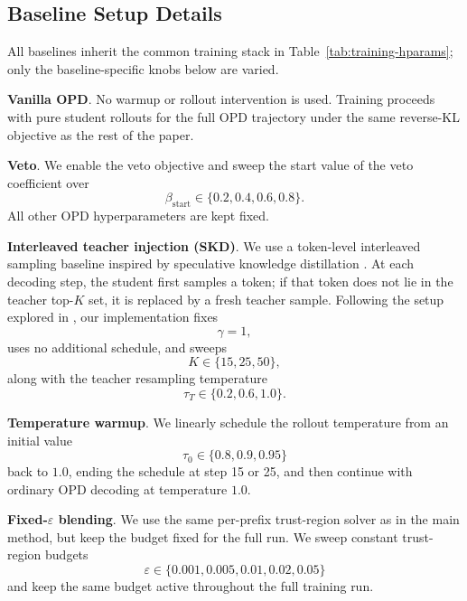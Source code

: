 \documentclass[11pt]{article}
\renewcommand{\paragraph}[1]{\vspace{1mm}\noindent\textbf{#1}.}
\begin{document}
\subsection{Baseline Setup Details}
\label{app:baseline_setups}

All baselines inherit the common training stack in Table~\ref{tab:training-hparams}; only the baseline-specific knobs below are varied.

\paragraph{Vanilla OPD}
No warmup or rollout intervention is used.
Training proceeds with pure student rollouts for the full OPD trajectory under the same reverse-KL objective as the rest of the paper.

\paragraph{Veto}
We enable the veto objective \citep{veto} and sweep the start value of the veto coefficient over
\[
\beta_{\mathrm{start}} \in \{0.2, 0.4, 0.6, 0.8\}.
\]
All other OPD hyperparameters are kept fixed.

\paragraph{Interleaved teacher injection (SKD)}
We use a token-level interleaved sampling baseline inspired by speculative knowledge distillation \citep{skd}.
At each decoding step, the student first samples a token; if that token does not lie in the teacher top-$K$ set, it is replaced by a fresh teacher sample.
Following the setup explored in \citet{skd}, our implementation fixes
\[
 \gamma = 1,
\]
uses no additional schedule, and sweeps
\[
K \in \{15,25,50\},
\]
along with the teacher resampling temperature
\[
\tau_T \in \{0.2, 0.6, 1.0\}.
\]

\paragraph{Temperature warmup}
We linearly schedule the rollout temperature from an initial value
\[
\tau_0 \in \{0.8, 0.9, 0.95\}
\]
back to $1.0$, ending the schedule at step 15 or 25, and then continue with ordinary OPD decoding at temperature $1.0$.

\paragraph{Fixed-$\varepsilon$ blending}
We use the same per-prefix trust-region solver as in the main method, but keep the budget fixed for the full run.
We sweep constant trust-region budgets
\[
\varepsilon \in \{0.001, 0.005, 0.01, 0.02, 0.05\}
\]
and keep the same budget active throughout the full training run.
\end{document}
